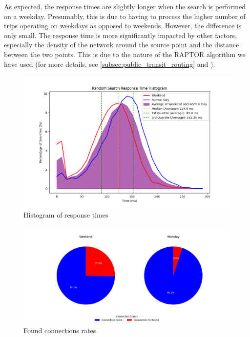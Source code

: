 As expected, the response times are slightly longer when the search is performed on a weekday. Presumably, this is due to having to process the higher number of trips operating on weekdays as opposed to weekends. However, the difference is only small. The response time is more significantly impacted by other factors, especially the density of the network around the source point and the distance between the two points. This is due to the nature of the RAPTOR algorithm we have used (for more details, see \cref{subsec:public_transit_routing} and \textcite{delling2015raptor}).

\begin{figure}[h!]
    \centering
    \includegraphics[width=\textwidth]{img/histogram.png}
    \caption{Histogram of response times}
    \label{fig:response_time_histogram}
\end{figure}

\begin{figure}[h!]
    \centering
    \includegraphics[width=\textwidth]{img/success_rates.png}
    \caption{Found connections rates}
    \label{fig:success_rates}
\end{figure}


